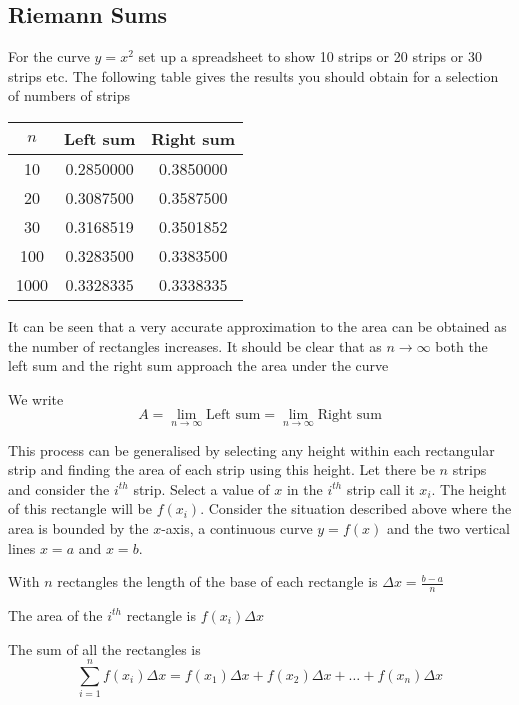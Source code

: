 \subsection{Riemann Sums}
For the curve $y =x^{2}$ set up a spreadsheet to show 10 strips or 20 strips or
30 strips etc. The following table gives the results you should obtain for a selection of numbers of strips

\begin{center}
\begin{tabular}[c]{|c|c|c|}\hline
$n$  & Left sum  & Right sum  \\
\hline
10
& 0.2850000  & 0.3850000  \\
\hline
20
& 0.3087500  & 0.3587500  \\
\hline
30
& 0.3168519  & 0.3501852  \\
\hline
100
& 0.3283500  & 0.3383500  \\
\hline
1000
& 0.3328335  & 0.3338335  \\
\hline
\end{tabular}\end{center}

It can be seen that a very accurate approximation to the area can be obtained as the number of rectangles increases. It
should be clear that as $n \rightarrow \infty $ both the left sum and the right sum approach the area under the curve 

We write
\begin{equation*}A =\underset{n \rightarrow \infty }{\lim }\text{Left sum} =\underset{n \rightarrow \infty }{\lim }\text{Right sum}
\end{equation*}

This process can be generalised by selecting any height within each rectangular strip
and finding the area of each strip using this height. Let there be $n$ strips and consider the $i^{t h}$ strip. Select a value of $x$ in the $i^{t h}$ strip call it $x_{i}$. The height of this rectangle will be $f (x_{i})$. Consider the situation described above where the area is bounded by the $x$-axis, a continuous curve $y =f (x)$ and the two vertical lines $x =a$ and $x =b$. 

With $n$ rectangles the length of the base of each rectangle is $ \Delta x =\frac{b -a}{n}$ 

The area of the $i^{t h}$ rectangle is $f (x_{i})  \Delta x$ 

The sum of all the rectangles is
\begin{equation*}\underset{i =1}{\sum ^{n}} f (x_{i})  \Delta x =f \left (x_{1}\right )  \Delta x +f \left (x_{2}\right )  \Delta x +\ldots  +f \left (x_{n}\right )  \Delta x
\end{equation*}

